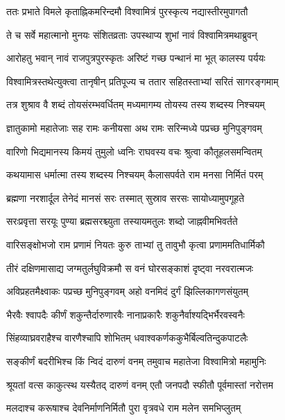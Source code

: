 
\twolineshloka
{ततः प्रभाते विमले कृताह्निकमरिन्दमौ}
{विश्वामित्रं पुरस्कृत्य नद्यास्तीरमुपागतौ} %

\twolineshloka
{ते च सर्वे महात्मानो मुनयः संशितव्रताः}
{उपस्थाप्य शुभां नावं विश्वामित्रमथाब्रुवन्} %

\twolineshloka
{आरोहतु भवान् नावं राजपुत्रपुरस्कृतः}
{अरिष्टं गच्छ पन्थानं मा भूत् कालस्य पर्ययः} %

\twolineshloka
{विश्वामित्रस्तथेत्युक्त्वा तानृषीन् प्रतिपूज्य च}
{ततार सहितस्ताभ्यां सरितं सागरङ्गमाम्} %

\twolineshloka
{तत्र शुश्राव वै शब्दं तोयसंरम्भवर्धितम्}
{मध्यमागम्य तोयस्य तस्य शब्दस्य निश्चयम्} %

\twolineshloka
{ज्ञातुकामो महातेजाः सह रामः कनीयसा}
{अथ रामः सरिन्मध्ये पप्रच्छ मुनिपुङ्गवम्} %

\twolineshloka
{वारिणो भिद्यमानस्य किमयं तुमुलो ध्वनिः}
{राघवस्य वचः श्रुत्वा कौतूहलसमन्वितम्} %

\twolineshloka
{कथयामास धर्मात्मा तस्य शब्दस्य निश्चयम्}
{कैलासपर्वते राम मनसा निर्मितं परम्} %

\twolineshloka
{ब्रह्मणा नरशार्दूल तेनेदं मानसं सरः}
{तस्मात् सुस्राव सरसः सायोध्यामुपगूहते} %

\twolineshloka
{सरःप्रवृत्ता सरयूः पुण्या ब्रह्मसरश्च्युता}
{तस्यायमतुलः शब्दो जाह्नवीमभिवर्तते} %

\twolineshloka
{वारिसङ्क्षोभजो राम प्रणामं नियतः कुरु}
{ताभ्यां तु तावुभौ कृत्वा प्रणाममतिधार्मिकौ} %

\twolineshloka
{तीरं दक्षिणमासाद्य जग्मतुर्लघुविक्रमौ}
{स वनं घोरसङ्काशं दृष्ट्वा नरवरात्मजः} %

\twolineshloka
{अविप्रहतमैक्ष्वाकः पप्रच्छ मुनिपुङ्गवम्}
{अहो वनमिदं दुर्गं झिल्लिकागणसंयुतम्} %

\twolineshloka
{भैरवैः श्वापदैः कीर्णं शकुन्तैर्दारुणारवैः}
{नानाप्रकारैः शकुनैर्वाश्यद्भिर्भैरवस्वनैः} %

\twolineshloka
{सिंहव्याघ्रवराहैश्च वारणैश्चापि शोभितम्}
{धवाश्वकर्णककुभैर्बिल्वतिन्दुकपाटलैः} %

\twolineshloka
{सङ्कीर्णं बदरीभिश्च किं न्विदं दारुणं वनम्}
{तमुवाच महातेजा विश्वामित्रो महामुनिः} %

\twolineshloka
{श्रूयतां वत्स काकुत्स्थ यस्यैतद् दारुणं वनम्}
{एतौ जनपदौ स्फीतौ पूर्वमास्तां नरोत्तम} %

\twolineshloka
{मलदाश्च करूषाश्च देवनिर्माणनिर्मितौ}
{पुरा वृत्रवधे राम मलेन समभिप्लुतम्} %

